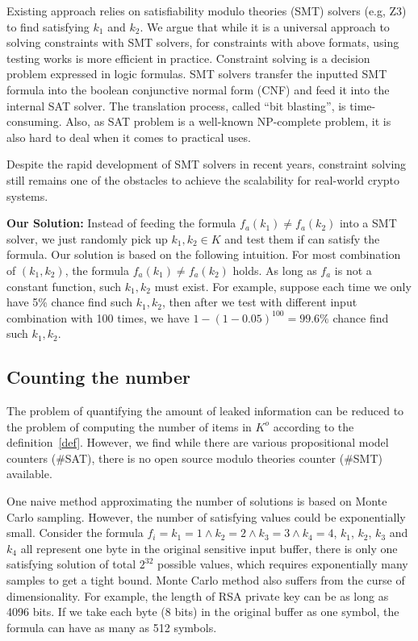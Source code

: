 Existing approach relies on satisfiability modulo theories (SMT) solvers (e.g, Z3) to 
find satisfying $k_1$ and $k_2$.
We argue that while it is a universal approach to solving constraints with SMT 
solvers, for constraints with above formats, using testing works is more
efficient in practice. Constraint solving is a decision problem expressed in 
logic formulas. SMT solvers transfer the inputted SMT formula into 
the boolean conjunctive normal form (CNF) and feed it into the internal 
SAT solver. The translation process, called ``bit blasting'', is time-consuming.
Also, as SAT problem is a well-known NP-complete problem, it is also hard to 
deal when it comes to practical uses.

Despite the rapid development of SMT solvers in recent years, constraint solving still
remains one of the obstacles to achieve the scalability for real-world crypto systems.

\vspace*{2pt}
\textbf{Our Solution:}
Instead of feeding the formula $f_a(k_1) \neq f_a(k_2)$ into a SMT solver, we just
randomly pick up $k_1, k_2 \in K$ and test them if can satisfy the formula. Our
solution is based on the following intuition. For most combination of 
$(k_{1}, k_{2} )$, the formula $f_a(k_1) \neq f_a(k_2)$ holds. As long as 
$f_a$ is not a constant function, such $k_1, k_2$ must exist. For example,
suppose each time we only have 5\% chance find such $k_1, k_2$, then
after we test with different input combination with 100 times, we have 
$1 - (1-0.05)^{100} = 99.6\%$ chance find such $k_1, k_2$.

\subsection{Counting the number}
\label{MCreasons}
The problem of quantifying the amount of leaked information can be reduced to 
the problem of computing the number of items in $K^o$ according to the definition~\ref{def}.
However, we find while there are various propositional model counters (\#SAT), there is no
open source modulo theories counter (\#SMT) available.

One naive method approximating the number of solutions is based on Monte Carlo sampling.
However, the number of satisfying values could be exponentially small. Consider the formula
$f_i={k_1} = 1\land{k_2} = 2\land{k_3} = 3\land{k_4} = 4$, $k_1$, $k_2$, $k_3$ and $k_4$ 
all represent one byte in the original sensitive input buffer, 
there is only one satisfying solution of total $2^{32}$ possible
values, which requires exponentially many samples to get a tight bound. 
Monte Carlo method also suffers from the curse of dimensionality. For example, 
the length of RSA private key can be as long as 4096 bits.
If we take each byte (8 bits) in the original buffer as one symbol, the formula can have 
as many as 512 symbols. 

